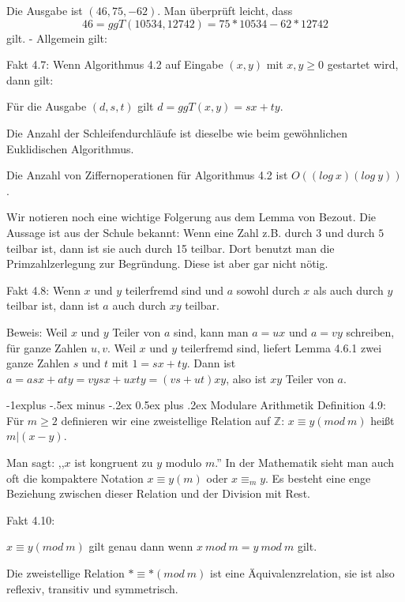 \documentclass[a4paper]{article}
\makeatletter
\renewcommand{\subsection}{\@startsection{subsection}{2}{0mm}%
 {-1explus -.5ex minus -.2ex}%
 {0.5ex plus .2ex}%
 {\normalfont\normalsize\bfseries}}
\makeatother
\begin{document}
\begin{multicols}{3}
    Die Ausgabe ist $(46, 75 ,-62)$. Man überprüft leicht, dass
    $$46 = ggT(10534,12742) = 75* 10534 - 62 * 12742$$
    gilt. - Allgemein gilt:

    Fakt 4.7: Wenn Algorithmus 4.2 auf Eingabe $(x,y)$ mit $x,y\geq 0$ gestartet wird, dann gilt:
    \begin{enumerate*}
        \item Für die Ausgabe $(d,s,t)$ gilt $d= ggT(x,y) =sx+ty$.
        \item Die Anzahl der Schleifendurchläufe ist dieselbe wie beim gewöhnlichen Euklidischen Algorithmus.
        \item Die Anzahl von Ziffernoperationen für Algorithmus 4.2 ist $O((log\ x)(log\ y))$.
    \end{enumerate*}

    Wir notieren noch eine wichtige Folgerung aus dem Lemma von Bezout. Die Aussage ist aus der Schule bekannt: Wenn eine Zahl z.B. durch $3$ und durch $5$ teilbar ist, dann ist sie auch durch 15 teilbar. Dort benutzt man die Primzahlzerlegung zur Begründung. Diese ist aber gar nicht nötig.

    Fakt 4.8: Wenn $x$ und $y$ teilerfremd sind und $a$ sowohl durch $x$ als auch durch $y$ teilbar ist, dann ist $a$ auch durch $xy$ teilbar.

    Beweis: Weil $x$ und $y$ Teiler von $a$ sind, kann man $a=ux$ und $a=vy$ schreiben, für ganze Zahlen $u,v$. Weil $x$ und $y$ teilerfremd sind, liefert Lemma 4.6.1 zwei ganze Zahlen $s$ und $t$ mit $1=sx+ty$. Dann ist $a=asx+aty=vysx+uxty= (vs+ut)xy$, also ist $xy$ Teiler von $a$.

    \subsection{Modulare Arithmetik}
    Definition 4.9: Für $m\geq 2$ definieren wir eine zweistellige Relation auf $\mathbb{Z}$: $x\equiv y (mod\ m)$ heißt $m|(x-y)$.

    Man sagt: ,,$x$ ist kongruent zu $y$ modulo $m$.'' In der Mathematik sieht man auch oft die kompaktere Notation $x\equiv y(m)$ oder $x\equiv_m y$. Es besteht eine enge Beziehung zwischen dieser Relation und der Division mit Rest.

    Fakt 4.10:
    \begin{enumerate*}
        \item $x\equiv y(mod\ m)$ gilt genau dann wenn $x\ mod\ m=y\ mod\ m$ gilt.
        \item Die zweistellige Relation $*\equiv *(mod\ m)$ ist eine Äquivalenzrelation, sie ist also reflexiv, transitiv und symmetrisch.
    \end{enumerate*}


\end{multicols}
\end{document}
